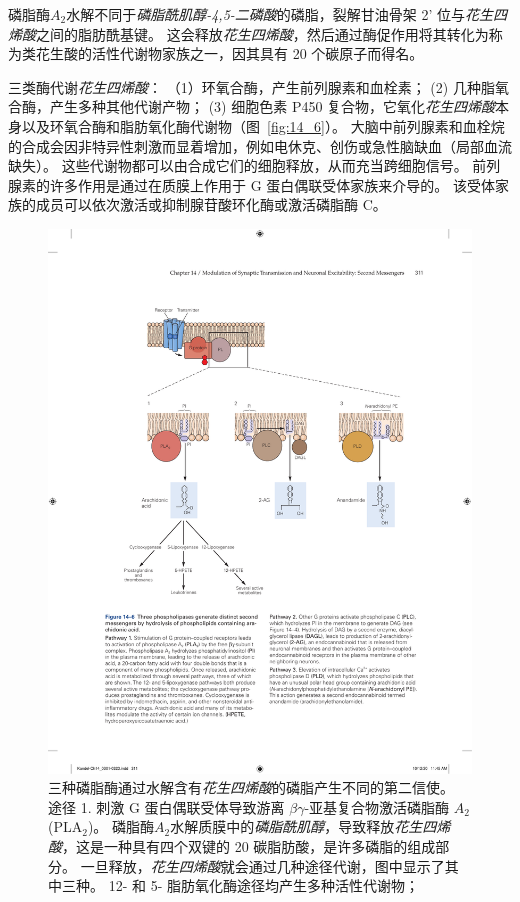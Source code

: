 磷脂酶$A_2$水解不同于\textit{磷脂酰肌醇-4,5-二磷酸}的磷脂，裂解甘油骨架 2' 位与\textit{花生四烯酸}之间的脂肪酰基键。
这会释放\textit{花生四烯酸}，然后通过酶促作用将其转化为称为类花生酸的活性代谢物家族之一，因其具有 20 个碳原子而得名。


三类酶代谢\textit{花生四烯酸}：
（1）环氧合酶，产生前列腺素和血栓素；
(2) 几种脂氧合酶，产生多种其他代谢产物；
(3) 细胞色素 P450 复合物，它氧化\textit{花生四烯酸}本身以及环氧合酶和脂肪氧化酶代谢物（图~\ref{fig:14_6}）。
大脑中前列腺素和血栓烷的合成会因非特异性刺激而显着增加，例如电休克、创伤或急性脑缺血（局部血流缺失）。
这些代谢物都可以由合成它们的细胞释放，从而充当跨细胞信号。
前列腺素的许多作用是通过在质膜上作用于 G 蛋白偶联受体家族来介导的。
该受体家族的成员可以依次激活或抑制腺苷酸环化酶或激活磷脂酶 C。


\begin{figure}[htbp]
	\centering
	\includegraphics[width=0.8\linewidth]{chap14/fig_14_6}
	\caption{三种磷脂酶通过水解含有\textit{花生四烯酸}的磷脂产生不同的第二信使。
		途径 1. 刺激 G 蛋白偶联受体导致游离 $\beta \gamma$-亚基复合物激活磷脂酶 $A_2$ (PLA$_2$)。
		磷脂酶$A_2$水解质膜中的\textit{磷脂酰肌醇}，导致释放\textit{花生四烯酸}，这是一种具有四个双键的 20 碳脂肪酸，是许多磷脂的组成部分。
		一旦释放，\textit{花生四烯酸}就会通过几种途径代谢，图中显示了其中三种。
		12- 和 5- 脂肪氧化酶途径均产生多种活性代谢物；
}
\end{figure}

